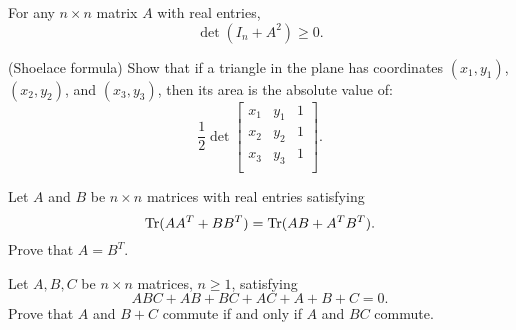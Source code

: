 \documentclass{article}
\begin{document}
        \begin{exercise}
        For any $n \times n$ matrix $A$ with real entries,
        \[
        \det(I_{n} + A^{2}) \geq 0.
        \]
        \end{exercise}
        
        \begin{exercise}
        (Shoelace formula) Show that if a triangle in the plane has coordinates $(x_{1}, y_{1})$, $(x_{2}, y_{2})$, and $(x_{3}, y_{3})$, then its area is the absolute value of:
        \[\frac{1}{2} \det \begin{bmatrix}
        x_{1}&y_{1}&1\\
        x_{2}&y_{2}&1\\
        x_{3}&y_{3}&1\\
        \end{bmatrix}.
        \]
        \end{exercise}

        \begin{exercise}
            Let $A$ and $B$ be $n \times n$ matrices with real entries satisfying 
            \[\operatorname{Tr}(A A^{T} + B B^{T}) = \operatorname{Tr}(AB + A^{T}B^{T}).  
            \]
            Prove that $A = B^{T}$. 
            \end{exercise}
            
            \begin{exercise}
                Let $A, B, C$ be $n \times n$ matrices, $n \geq 1$, satisfying 
            \[ABC + AB + BC + AC + A + B + C = 0.
            \]
            Prove that $A$ and $B + C$ commute if and only if $A$ and $BC$ commute. 
            \end{exercise}
            
            
\end{document}
